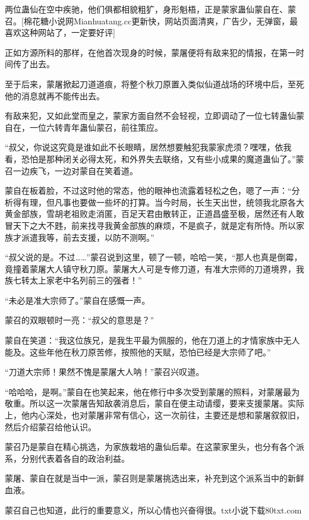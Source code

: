 
\begin{this_body}

两位蛊仙在空中疾驰，他们俱都相貌粗犷，身形魁梧，正是蒙家蛊仙蒙自在、蒙召。[棉花糖小说网Mianhuatang.cc更新快，网站页面清爽，广告少，无弹窗，最喜欢这种网站了，一定要好评]

正如方源所料的那样，在他首次现身的时候，蒙屠便将有敌来犯的情报，在第一时间传了出去。

至于后来，蒙屠掀起刀道道痕，将整个秋刀原置入类似仙道战场的环境中后，至死他的消息就再不能传出去。

有敌来犯，又如此堂而皇之，蒙家方面自然不会轻视，立即调动了一位七转蛊仙蒙自在，一位六转青年蛊仙蒙召，前往策应。

“叔父，你说这究竟是谁如此不长眼睛，居然想要触犯我蒙家虎须？嘿嘿，依我看，恐怕是那种闭关必得太死，和外界失去联络，又有些小成果的魔道蛊仙了。”蒙召一边疾飞，一边对蒙自在笑着道。

蒙自在板着脸，不过这时他的常态，他的眼神也流露着轻松之色，嗯了一声：“分析得有理，但凡事也要做一些坏的打算。当今时局，长生天出世，统领我北原各大黄金部族，雪胡老祖败走消匿，百足天君由散转正，正道昌盛至极，居然还有人敢冒天下之大不韪，前来找寻我黄金部族的麻烦，不是疯子，就是定有所恃。所以家族才派遣我等，前去支援，以防不测啊。”

“叔父说的是。不过……”蒙召说到这里，顿了一顿，哈哈一笑，“那人也真是倒霉，竟撞着蒙屠大人镇守秋刀原。蒙屠大人可是专修刀道，有准大宗师的刀道境界，我族七转太上家老中名列前三的强者！”

“未必是准大宗师了。”蒙自在感慨一声。

蒙召的双眼顿时一亮：“叔父的意思是？”

蒙自在笑道：“我这位族兄，是我生平最为佩服的，他在刀道上的才情家族中无人能及。这些年他在秋刀原苦修，按照他的天赋，恐怕已经是大宗师了吧。”

“刀道大宗师！果然不愧是蒙屠大人呐！”蒙召兴叹道。

“哈哈哈，是啊。”蒙自在也笑起来，他在修行中多次受到蒙屠的照料，对蒙屠最为敬重。所以这一次蒙屠告知敌袭消息后，蒙自在便主动请缨，要来支援蒙屠。实际上，他内心深处，也对蒙屠非常有信心，这一次前往，主要还是想和蒙屠叙叙旧，然后介绍蒙召给他认识。

蒙召乃是蒙自在精心挑选，为家族栽培的蛊仙后辈。在这蒙家里头，也分有各个派系，分别代表着各自的政治利益。

蒙屠、蒙自在就是当中一派，蒙召则是蒙屠挑选出来，补充到这个派系当中的新鲜血液。

蒙召自己也知道，此行的重要意义，所以心情也兴奋得很。txt小说下载80txt.com


\end{this_body}
